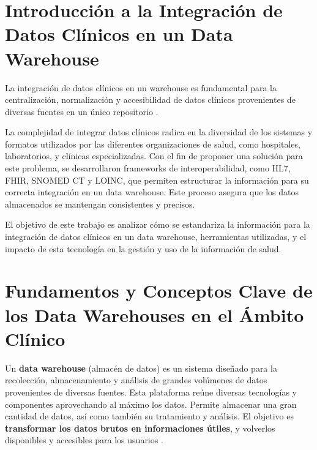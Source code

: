 \documentclass[12pt, a4paper, twoside]{article}
\begin{document}
	
	
	
	\clearpage
	\setcounter{page}{1}
	
	
	
	\tableofcontents
	\newpage
	
	\section{Introducción a la Integración de Datos Clínicos en un Data Warehouse}
	
	La integración de datos clínicos en un warehouse es fundamental para la centralización, normalización y accesibilidad de datos clínicos provenientes de diversas fuentes en un único repositorio  \cite{founderzDW}\cite{asteraHealthcareData}.
	
	La complejidad de integrar datos clínicos radica en la diversidad de los sistemas y formatos utilizados por las diferentes organizaciones de salud, como hospitales, laboratorios, y clínicas especializadas\cite{revistaMedicaManejoInformacion}. Con el fin de proponer una solución para este problema, se desarrollaron frameworks de interoperabilidad, como HL7, FHIR, SNOMED CT y LOINC, que permiten estructurar la información para su correcta integración en un data warehouse\cite{meditecsInteroperabilidad}. Este proceso asegura que los datos almacenados se mantengan consistentes y precisos\cite{founderzDW}.
	
	El objetivo de este trabajo es analizar cómo se estandariza la información para la integración de datos clínicos en un data warehouse, herramientas utilizadas, y el impacto de esta tecnología en la gestión y uso de la información de salud.
	
	
	\section{Fundamentos y Conceptos Clave de los Data Warehouses en el Ámbito Clínico}
	
	Un \textbf{data warehouse} (almacén de datos) es un sistema diseñado para la recolección, almacenamiento y análisis de grandes volúmenes de datos provenientes de diversas fuentes. Esta plataforma reúne diversas tecnologías y componentes aprovechando al máximo los datos. Permite almacenar una gran cantidad de datos, así como también su tratamiento y análisis. El objetivo es \textbf{transformar los datos brutos en informaciones útiles}, y volverlos disponibles y accesibles para los usuarios \cite{Portal2017}.
	
\end{document}
